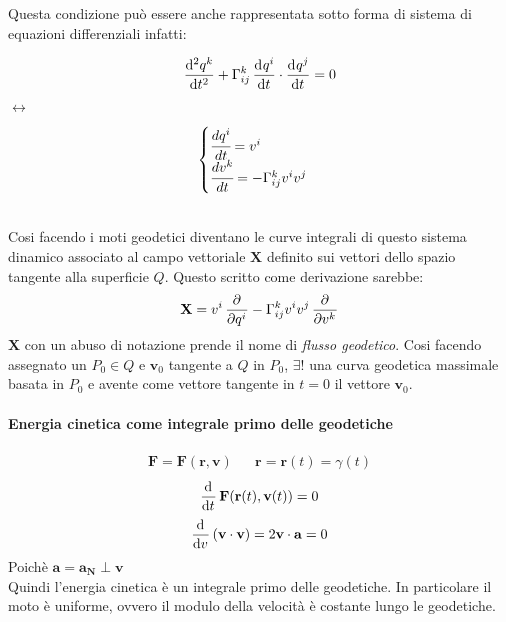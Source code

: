 Questa condizione può essere anche rappresentata sotto forma di sistema di equazioni differenziali infatti:\\
\begin{minipage}{4cm}
    \begin{align*}
        \dod[2]{q^k}{t}+\Gamma^k_{ij}\dod{q^i}{t}\cdot \dod{q^j}{t}=0
    \end{align*}
\end{minipage}$\longleftrightarrow$
\begin{minipage}{4cm}
    \begin{align*}
        \begin{cases}
            \cfrac{dq^i}{dt}=v^i\\
            \cfrac{dv^k}{dt}=-\Gamma^k_{ij}v^iv^j
        \end{cases}
    \end{align*}
\end{minipage}
\\
Cosi facendo i moti geodetici diventano le curve integrali di questo sistema dinamico associato al campo vettoriale $\mathbf{X}$ definito sui vettori dello spazio tangente alla superficie $Q$. Questo scritto come derivazione sarebbe:
\begin{align*}
    \mathbf{X}=v^i\dpd{}{{q^i}}-\Gamma^k_{ij}v^iv^j\dpd{}{{v^k}}
\end{align*}
$\mathbf{X}$ con un abuso di notazione prende il nome di \emph{flusso geodetico}.
Cosi facendo assegnato un $P_0\in Q$ e $\mathbf{v}_0$ tangente a $Q$ in $P_0$, $\exists!$ una curva geodetica massimale basata in $P_0$ e avente come vettore tangente in $t=0$ il vettore $\mathbf{v}_0$.
\paragraph*{Energia cinetica come integrale primo delle geodetiche}
\begin{align*}
    \mathbf{F}=\mathbf{F}(\mathbf{r},\mathbf{v}) && \mathbf{r}=\mathbf{r}(t)=\gamma(t)
\end{align*}
\begin{align*}
    \dod{}{t}\mathbf{F}(\mathbf{r}(t),\mathbf{v}(t))=0
\end{align*}
\begin{align*}
    \dod{}{v}(\mathbf{v}\cdot \mathbf{v})=2\mathbf{v}\cdot\mathbf{a}=0
\end{align*}
Poichè $\mathbf{a}=\mathbf{a}_{\mathbf{N}}\perp \mathbf{v}$\\
Quindi l'energia cinetica è un integrale primo delle geodetiche. In particolare il moto è uniforme, ovvero il modulo della velocità è costante lungo le geodetiche.